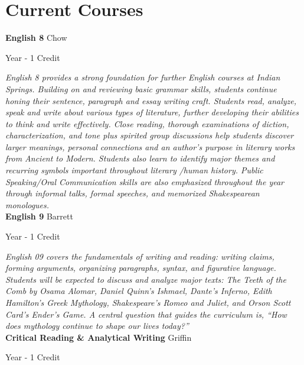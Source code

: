 \section{Current Courses}

\noindent\textbf{English 8} \hfill Chow

\noindent Year - 1 Credit

\vspace{1mm}\emph{English 8 provides a strong foundation for further English courses at Indian Springs. Building on and reviewing basic grammar skills, students continue honing their sentence, paragraph and essay writing craft. Students read, analyze, speak and write about various types of literature, further developing their abilities to think and write effectively. Close reading, thorough examinations of diction, characterization, and tone plus spirited group discussions help students discover larger meanings, personal connections and an author's purpose in literary works from Ancient to Modern. Students also learn to identify major themes and recurring symbols important throughout literary /human history. Public Speaking/Oral Communication skills are also emphasized throughout the year through informal talks, formal speeches, and memorized Shakespearean monologues.}\\


\noindent\textbf{English 9} \hfill Barrett

\noindent Year - 1 Credit

\vspace{1mm}\emph{English 09 covers the fundamentals of writing and reading: writing claims, forming arguments, organizing paragraphs, syntax, and figurative language. Students will be expected to discuss and analyze major texts: The Teeth of the Comb by Osama Alomar, Daniel Quinn's Ishmael, Dante's Inferno, Edith Hamilton's Greek Mythology, Shakespeare's Romeo and Juliet, and Orson Scott Card's Ender's Game.  A central question that guides the curriculum is, ``How does mythology continue to shape our lives today?''}\\


\noindent\textbf{Critical Reading \& Analytical Writing} \hfill Griffin

\noindent Year - 1 Credit

